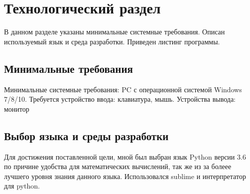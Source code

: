 \documentclass[12pt,a4paper]{scrartcl}
\begin{document}
\section{Технологический раздел}
	В данном разделе указаны минимальные системные требования. Описан используемый язык и среда разработки. 
	Приведен листинг программы.
	
	\subsection{Минимальные требования}
	 	Минимальные системные требования: PC с операционной системой Windows 7/8/10. 
	 	Требуется устройство ввода: клавиатура, мышь.
	 	Устройства вывода: монитор
	 	
	\subsection{Выбор языка и среды разработки}
		Для достижения поставленной цели, мной был выбран язык Python версии 3.6 по причине удобства для математических вычислений, так же из за болеее лучшего уровня знания данного языка.
		Использовался sublime и интерпретатор для python.
		
\end{document}
